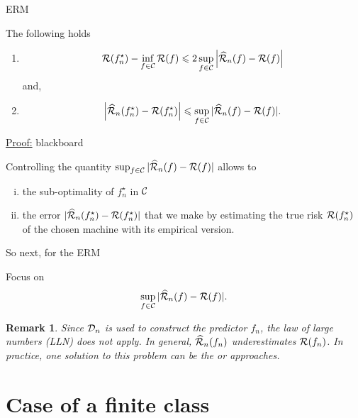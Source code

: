 \documentclass[xcolor={usenames,dvipsnames},handout]{beamer}
\newtheorem{remark}[theorem]{Remark}
\begin{document}
\begin{frame}{ERM}
\begin{lemma}
\label{lem:estim_term}
The following holds
\begin{enumerate}
\item $${\mathcal{R}}(f_n^\star) - \inf_{f\in \mathcal{C}} {\mathcal{R}}(f) \leqslant 2  \sup_{f\in \mathcal{C}} \left| \widehat{{\mathcal{R}}}_n (f) - {\mathcal{R}}(f)  \right|  $$
and,
\item
$$
\left| \widehat{{\mathcal{R}}}_n (f_n^\star) - {\mathcal{R}} (f_n^\star) \right| \leqslant \sup_{f\in \mathcal{C}} | \widehat{{\mathcal{R}}}_n(f) - {\mathcal{R}}(f) |.
$$ 
\end{enumerate}
\end{lemma}
{\small \underline{Proof:} blackboard}

Controlling the quantity $\sup_{f\in \mathcal{C}} | \widehat{{\mathcal{R}}}_n(f) - {\mathcal{R}}(f) |$ allows to
\begin{enumerate}[(i)]
\item the sub-optimality of $f_n^\star$ in $\mathcal{C}$ 
\item the error $|\widehat{{\mathcal{R}}}_n(f_n^\star) - {\mathcal{R}}(f_n^\star)|$ that we make by estimating the true risk ${\mathcal{R}}(f_n^\star)$ of the chosen machine with its empirical version. 
\end{enumerate}
\end{frame}

\begin{frame}{So next, for the ERM}
\begin{exampleblock}{Focus on}
$$
\sup_{f\in \mathcal{C}} | \widehat{{\mathcal{R}}}_n(f) - {\mathcal{R}}(f) |.
$$
\end{exampleblock}

\pause

 \begin{remark}
 Since ${\mathcal{D}}_n$ is used to construct the predictor $f_n$, the law of large numbers (LLN) does not apply. In general, $\widehat{{\mathcal{R}}}_n(f_n)$ underestimates ${\mathcal{R}} (f_n)$.
 In practice, one  solution to this problem can be the  or  approaches.
\end{remark}

\end{frame}


\section{Case of a finite class}
\label{sec:C_finie}
\end{document}
